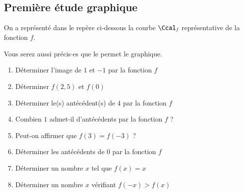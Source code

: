 \documentclass[oneside,12pt]{article}          			%
\begin{document}
\subsection{Première étude graphique}
On a représenté dans le repère ci-dessous la courbe $\Ccal_f$ représentative de la fonction $f$.\\

\begin{minipage}{0.55\linewidth}
Vous serez aussi précis$\cdot$es que le permet le graphique.
    \begin{enumerate} \setlength{\itemsep}{1mm}
		\item Déterminer l'image de $1$ et $-1$ par la fonction $f$
		\item Déterminer $f(2,5)$ et $f(0)$
		\item Déterminer le(s) antécédent(s) de $4$ par la fonction $f$
		\item Combien $1$ admet-il d'antécédents par la fonction $f$ ?
		\item Peut-on affirmer que $f(3)=f(-3)$ ?
		\item Déterminer les antécédents de $0$ par la fonction $f$
		\item Déterminer un nombre $x$ tel que $f(x)=x$
		\item Déterminer un nombre $x$ vérifiant $f(-x)>f(x)$
    \end{enumerate}
\end{minipage} \hspace{1cm}
\begin{minipage}{0.5\linewidth}
\end{minipage}
\end{document}
